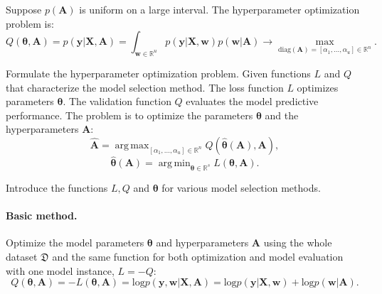 \documentclass[smallextended]{svjour3}
\DeclareMathOperator*{\argmin}{arg\,min}
\DeclareMathOperator*{\argmax}{arg\,max}
\begin{document}
Suppose $p(\mathbf{A})$ is uniform on a large interval. The hyperparameter optimization problem is:
\begin{equation}
\label{eq:bayes2}
	Q(\boldsymbol{\theta}, \mathbf{A}) = p(\mathbf{y}|\mathbf{X},\mathbf{A}) = \int_{\mathbf{w} \in \mathbb{R}^u} p(\mathbf{y}|\mathbf{X}, \mathbf{w}) p(\mathbf{w}|\mathbf{A}) \to \max_{\text{diag}(\mathbf{A}) = [\alpha_1, \dots, \alpha_u] \in \mathbb{R}^{n}}.
\end{equation}


 
   


Formulate the hyperparameter optimization problem. Given functions $L$ and $Q$ that characterize the model selection method. The loss function $L$ optimizes parameters $\boldsymbol{\theta}$. The validation function $Q$ evaluates the model predictive performance.
The problem is to optimize the parameters $\boldsymbol{\theta}$ and the hyperparameters $\mathbf{A}$: 
\begin{equation}
\label{eq:main}
	\hat{\mathbf{A}} = \argmax_{[\alpha_1, \dots, \alpha_u] \in \mathbb{R}^n} Q(\hat{\boldsymbol{\theta}}(\mathbf{A}), \mathbf{A}),
\end{equation}
\begin{equation}
\label{eq:main2}
	\hat{\boldsymbol{\theta}}(\mathbf{A}) =  \argmin_{\boldsymbol{\theta} \in \mathbb{R}^s} L(\boldsymbol{\theta}, \mathbf{A}).
\end{equation}

Introduce the functions $L, Q$ and $\boldsymbol{\theta}$ for various model selection methods.

\paragraph{Basic method.}
Optimize the model parameters $\boldsymbol{\theta}$ and hyperparameters $\mathbf{A}$ using the whole dataset $\mathfrak{D}$ and the same function for both optimization and model evaluation with one model instance, $L = -Q$:
\begin{equation} 
\label{eq:basic}
Q(\boldsymbol{\theta}, \mathbf{A}) = -L(\boldsymbol{\theta}, \mathbf{A})  = \text{log}p(\mathbf{y}, \mathbf{w} | \mathbf{X}, \mathbf{A}) = \text{log} p(\mathbf{y}|\mathbf{X}, \mathbf{w})+\text{log}p(\mathbf{w}|\mathbf{A}).
\end{equation}
\end{document}
